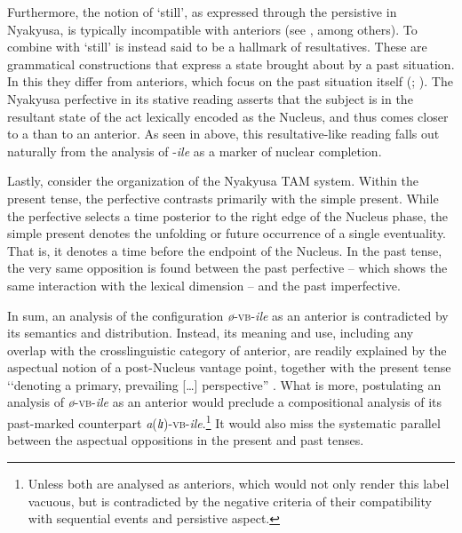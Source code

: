 Furthermore, the notion of \lq still', as expressed through the persistive in Nyakyusa, is typically incompatible with anteriors (see \citealt{NedjalkovPJaxontovS1988}, among others). To combine with `still' is instead said to be a hallmark of resultatives. These are grammatical constructions that express a state brought about by a past situation. In this they differ from anteriors, which focus on the past situation itself (\citealt[134]{DahlOe1985}; \citealt[69]{BybeePerkinsPaglucia1994}). The Nyakyusa perfective in its stative reading asserts that the subject is in the resultant state of the act lexically encoded as the Nucleus, and thus comes closer to a  than to an anterior. As seen in  above, this resultative-like reading falls out naturally from the analysis of \mbox{-\textit{ile}} as a marker of nuclear completion.

Lastly, consider the organization of the Nyakyusa TAM system. Within the present tense, the perfective contrasts primarily with the simple present. While the perfective selects a time posterior to the right edge of the Nucleus phase, the simple present denotes the unfolding or future occurrence of a single eventuality. That is, it denotes a time before the endpoint of the Nucleus. In the past tense, the very same opposition is found between the past perfective -- which shows the same interaction with the lexical dimension -- and the past imperfective.

In sum, an analysis of the configuration \textit{ø}-\textsc{vb}-\textit{ile} as an anterior is contradicted by its semantics and distribution. Instead, its meaning and use, including any overlap with the crosslinguistic category of anterior, are readily explained by the aspectual notion of a post-Nucleus vantage point, together with the present tense \lq\lq denoting a primary, prevailing [\ldots] perspective'' \citep[153]{BotneRKershnerT2008}. What is more, postulating an analysis of \textit{ø}-\textsc{vb}-\textit{ile} as an anterior would preclude a compositional analysis of its past-marked counterpart \mbox{\textit{a}(\textit{lɪ})-}\textsc{vb}-\mbox{\textit{ile}}.\footnote{Unless both are analysed as anteriors, which would not only render this label vacuous, but is contradicted by the negative criteria of their compatibility with sequential events and persistive aspect.} It would also miss the systematic parallel between the aspectual oppositions in the present and past tenses.
